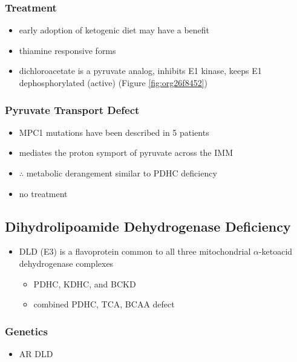 \documentclass[12pt]{scrartcl}
\begin{document}
\subsubsection{Treatment}
\label{sec:org4aedf5a}
\begin{itemize}
\item early adoption of ketogenic diet may have a benefit
\item thiamine responsive forms
\item dichloroacetate is a pyruvate analog, inhibits E1 kinase, keeps E1
dephosphorylated (active) (Figure \ref{fig:org26f8452})
\end{itemize}

\subsubsection{Pyruvate Transport Defect}
\label{sec:org1528a8a}
\begin{itemize}
\item MPC1 mutations have been described in 5 patients
\item mediates the proton symport of pyruvate across the IMM
\item \(\therefore\) metabolic derangement similar to PDHC deficiency
\item no treatment
\end{itemize}

\subsection{Dihydrolipoamide Dehydrogenase Deficiency}
\label{sec:orge6fe9d3}
\begin{itemize}
\item DLD (E3) is a flavoprotein common to all three mitochondrial
\(\alpha\)-ketoacid dehydrogenase complexes
\begin{itemize}
\item PDHC, KDHC, and BCKD
\item combined PDHC, TCA, BCAA defect
\end{itemize}
\end{itemize}
\subsubsection{Genetics}
\label{sec:orga4f29a8}
\begin{itemize}
\item AR DLD
\end{itemize}
\end{document}
